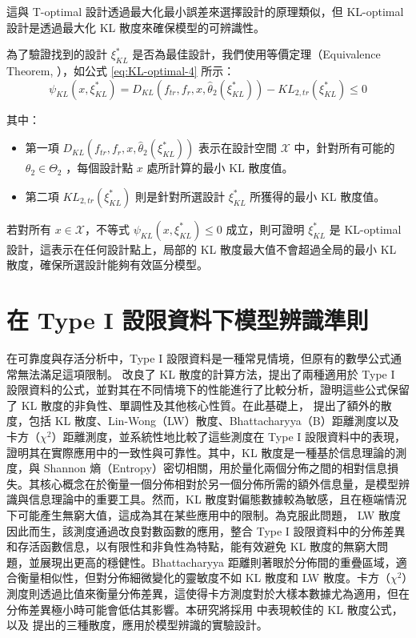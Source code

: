 \hspace*{8mm} 這與 T-optimal 設計透過最大化最小誤差來選擇設計的原理類似，但 KL-optimal 設計是透過最大化 KL 散度來確保模型的可辨識性。

\begin{theorem}
為了驗證找到的設計 $\xi_{KL}^\ast$ 是否為最佳設計，我們使用等價定理（Equivalence Theorem, \citep{atkinson1975design,atkinson1975optimal}），如公式 \eqref{eq:KL-optimal-4} 所示：
\begin{equation}\label{eq:KL-optimal-4}
\psi_{KL}(x,\xi_{KL}^\ast)=D_{KL}(f_{tr},f_r,x,\hat{\theta}_2(\xi_{KL}^\ast))-KL_{2,tr}(\xi_{KL}^\ast)\leq 0
\end{equation}

其中：
\begin{itemize}
\item 第一項 $D_{KL}(f_{tr}, f_r, x, \hat{\theta}_2(\xi^*_{KL}))$ 表示在設計空間 $\mathcal{X}$ 中，針對所有可能的 $\theta_2 \in \Theta_2$ ，每個設計點 $x$ 處所計算的最小 KL 散度值。
\item 第二項 $KL_{2,tr}(\xi^*_{KL})$ 則是針對所選設計 $\xi^*_{KL}$ 所獲得的最小 KL 散度值。
\end{itemize}
\end{theorem}

\hspace*{8mm} 若對所有 $x \in \mathcal{X}$，不等式 $\psi_{KL}(x, \xi^*_{KL}) \leq 0$ 成立，則可證明 $\xi^*_{KL}$ 是 KL-optimal 設計，這表示在任何設計點上，局部的 KL 散度最大值不會超過全局的最小 KL 散度，確保所選設計能夠有效區分模型。

\section{在 Type I 設限資料下模型辨識準則}

\hspace*{8mm} 在可靠度與存活分析中，Type I 設限資料是一種常見情境，但原有的數學公式通常無法滿足這項限制。\cite{park2014kullback} 改良了 KL 散度的計算方法，提出了兩種適用於 Type I 設限資料的公式，並對其在不同情境下的性能進行了比較分析，證明這些公式保留了 KL 散度的非負性、單調性及其他核心性質。在此基礎上，\cite{pakgohar2019lin} 提出了額外的散度，包括 KL 散度、Lin-Wong（LW）散度、Bhattacharyya（B）距離測度以及卡方（$\chi^2$）距離測度，並系統性地比較了這些測度在 Type I 設限資料中的表現，證明其在實際應用中的一致性與可靠性。其中，KL 散度是一種基於信息理論的測度，與 Shannon 熵（Entropy）密切相關，用於量化兩個分佈之間的相對信息損失。其核心概念在於衡量一個分佈相對於另一個分佈所需的額外信息量，是模型辨識與信息理論中的重要工具。然而，KL 散度對偏態數據較為敏感，且在極端情況下可能產生無窮大值，這成為其在某些應用中的限制。為克服此問題， LW 散度因此而生，該測度通過改良對數函數的應用，整合 Type I 設限資料中的分佈差異和存活函數信息，以有限性和非負性為特點，能有效避免 KL 散度的無窮大問題，並展現出更高的穩健性。Bhattacharyya 距離則著眼於分佈間的重疊區域，適合衡量相似性，但對分佈細微變化的靈敏度不如 KL 散度和 LW 散度。卡方（$\chi^2$）測度則透過比值來衡量分佈差異，這使得卡方測度對於大樣本數據尤為適用，但在分佈差異極小時可能會低估其影響。本研究將採用 \cite{park2014kullback} 中表現較佳的 KL 散度公式，以及 \cite{pakgohar2019lin} 提出的三種散度，應用於模型辨識的實驗設計。

